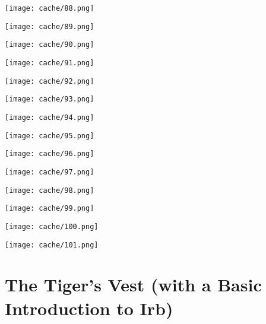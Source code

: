 \documentclass[12pt,twoside]{report}
\begin{document}
\vspace*{0.6cm} \texttt{[image: cache/88.png]}
\newpage

\vspace*{0.6cm} \texttt{[image: cache/89.png]}
\newpage

\vspace*{0.6cm} \texttt{[image: cache/90.png]}
\newpage

\vspace*{0.6cm} \texttt{[image: cache/91.png]}
\newpage

\vspace*{0.6cm} \texttt{[image: cache/92.png]}
\newpage

\vspace*{0.6cm} \texttt{[image: cache/93.png]}
\newpage

\vspace*{0.6cm} \texttt{[image: cache/94.png]}
\newpage

\vspace*{0.6cm} \texttt{[image: cache/95.png]}
\newpage

\vspace*{0.6cm} \texttt{[image: cache/96.png]}
\newpage

\vspace*{0.6cm}
\texttt{[image: cache/97.png]}
\newpage

\vspace*{0.6cm} \texttt{[image: cache/98.png]}
\newpage

\vspace*{0.6cm} \texttt{[image: cache/99.png]}
\newpage

\vspace*{0.6cm} \texttt{[image: cache/100.png]}
\newpage

\vspace*{0.6cm} \texttt{[image: cache/101.png]}
\newpage
\thispagestyle{empty}
\mbox{}
\newpage
\thispagestyle{empty}
\mbox{}

\cleartooddpage

\appendix
\renewcommand*{\thechapter}{\Roman{chapter}}
\chapter{The Tiger's Vest (with a Basic Introduction to Irb)}
\newpage
\thispagestyle{empty}
\mbox{}
\pagebreak
\end{document}
